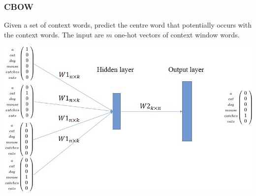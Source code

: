 \documentclass[11pt]{article}
\begin{document}
\subsubsection{CBOW}
\begin{minipage}{0.45\linewidth}
	Given a set of context words, predict the centre word that potentially occurs with the context words. The input are $m$ one-hot vectors of context window words.
	\vspace{5em}
\end{minipage}
\begin{minipage}{0.5\linewidth}
	\begin{center}
		\includegraphics[width=0.9\linewidth]{img/word2vec_cbow}
	\end{center}
\end{minipage}
\end{document}
